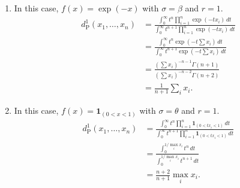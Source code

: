 \documentclass{homework}
\begin{document}
{\begin{enumerate}[label={(\alph*)}, topsep=0pt]
        \item In this case, $f(x) = \exp(-x)$ with $\sigma = \beta$ and $r=1$.
              \begin{align*}
                  d_{\mathrm P}^1 (x_1,\dots,x_n) & = \frac{\int_0^\infty t^{n} \prod_{i=1}^n \exp(-tx_i)\,dt }{\int_0^\infty t^{n+1} \prod_{i=1}^n \exp(-tx_i)\,dt }
                  \\ &= \frac{\int_0^\infty t^{n} \exp(-t\sum x_i)\,dt }{\int_0^\infty t^{n+1} \exp(-t\sum x_i)\,dt }
                  \\ &= \frac{ (\sum x_i)^{-n-1} \Gamma(n+1) }{ (\sum x_i)^{-n-2} \Gamma(n+2) } \\&= \frac{1}{n+1}\sum_i x_i.
              \end{align*}
        \item In this case, $f(x) = \mathbf 1_{(0<x<1)}$ with $\sigma = \theta$ and $r=1$.
              \begin{align*}
                  d_{\mathrm P}^1 (x_1,\dots,x_n) & = \frac{\int_0^\infty t^{n} \prod_{i=1}^n \mathbf 1_{(0<tx_i<1)}\,dt }{\int_0^\infty t^{n+1} \prod_{i=1}^n \mathbf 1_{(0<tx_i<1)}\,dt }
                  \\ &= \frac{ \int_0^{1/\max_i x_i} t^n\,dt }{ \int_0^{1/\max_i x_i} t^{n+1}\,dt }
                  \\ &= \frac{n+2}{n+1}\max_i x_i.
              \end{align*}
    \end{enumerate}
}
\end{document}
